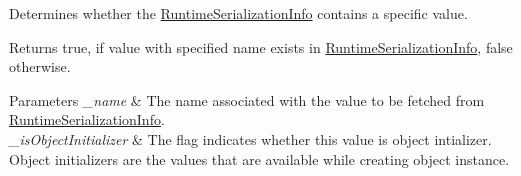 Determines whether the \hyperlink{class_voxel_busters_1_1_runtime_serialization_1_1_runtime_serialization_info}{Runtime\+Serialization\+Info} contains a specific value. 

\begin{DoxyReturn}{Returns}
{\ttfamily true}, if value with specified name exists in \hyperlink{class_voxel_busters_1_1_runtime_serialization_1_1_runtime_serialization_info}{Runtime\+Serialization\+Info}, {\ttfamily false} otherwise.
\end{DoxyReturn}

\begin{DoxyParams}{Parameters}
{\em \+\_\+name} & The name associated with the value to be fetched from \hyperlink{class_voxel_busters_1_1_runtime_serialization_1_1_runtime_serialization_info}{Runtime\+Serialization\+Info}.\\
\hline
{\em \+\_\+is\+Object\+Initializer} & The flag indicates whether this value is object intializer. Object initializers are the values that are available while creating object instance.\\
\hline
\end{DoxyParams}
